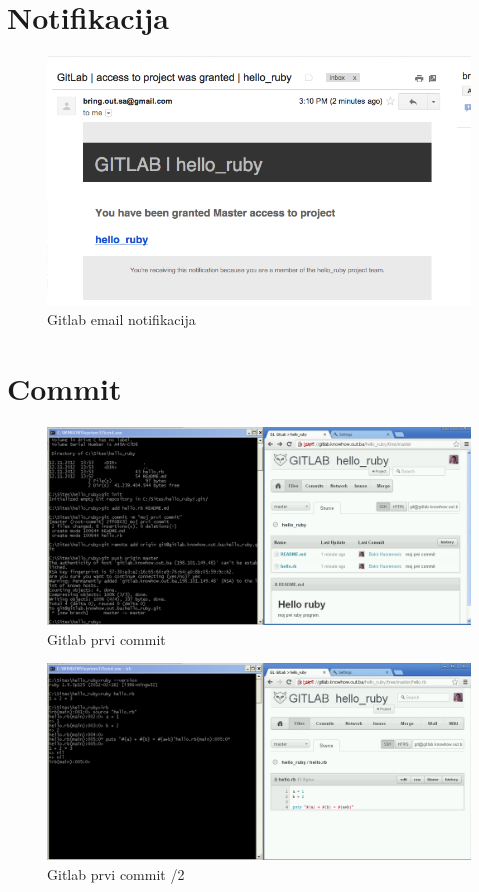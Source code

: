 \documentclass[times, utf8, seminar]{fit}
\begin{document}
\section{Notifikacija}

\begin{figure}[H]
\centering
\includegraphics[width=15cm]{img/gitlab_email_notification.png}
\caption{Gitlab email notifikacija}
\end{figure}


\section{Commit}

\begin{figure}[H]
\centering
\includegraphics[width=15cm]{img/gitlab_first_commit.png}
\caption{Gitlab prvi commit}
\end{figure}


\begin{figure}[H]
\centering
\includegraphics[width=15cm]{img/gitlab_first_commit_2.png}
\caption{Gitlab prvi commit /2}
\end{figure}
\end{document}
